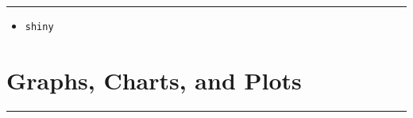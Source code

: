 \documentclass[
]{book}
\providecommand{\tightlist}{%
  \setlength{\itemsep}{0pt}\setlength{\parskip}{0pt}}
\begin{document}
\begin{center}\rule{0.5\linewidth}{0.5pt}\end{center}

\begin{itemize}
\tightlist
\item
  \texttt{shiny}
\end{itemize}

\hypertarget{graphs-charts-and-plots}{%
\section{Graphs, Charts, and Plots}\label{graphs-charts-and-plots}}

\begin{center}\rule{0.5\linewidth}{0.5pt}\end{center}
\end{document}
